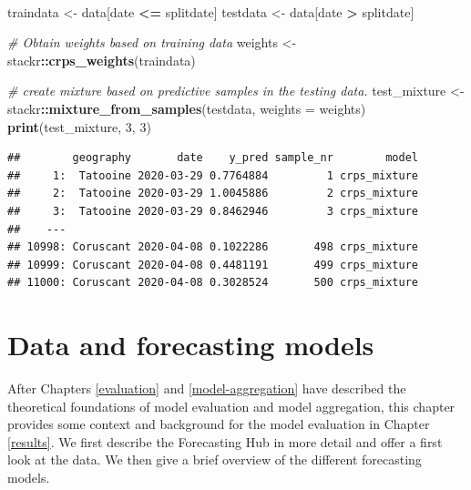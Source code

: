 \documentclass[
]{book}
\newenvironment{Shaded}{\begin{snugshade}}{\end{snugshade}}
\newcommand{\CommentTok}[1]{\textcolor[rgb]{0.56,0.35,0.01}{\textit{#1}}}
\newcommand{\DataTypeTok}[1]{\textcolor[rgb]{0.13,0.29,0.53}{#1}}
\newcommand{\DecValTok}[1]{\textcolor[rgb]{0.00,0.00,0.81}{#1}}
\newcommand{\KeywordTok}[1]{\textcolor[rgb]{0.13,0.29,0.53}{\textbf{#1}}}
\newcommand{\NormalTok}[1]{#1}
\newcommand{\OperatorTok}[1]{\textcolor[rgb]{0.81,0.36,0.00}{\textbf{#1}}}
\newcommand{\StringTok}[1]{\textcolor[rgb]{0.31,0.60,0.02}{#1}}
\begin{document}
\(~\)

\begin{Shaded}
\begin{Highlighting}[]
\NormalTok{traindata \textless{}{-}}\StringTok{ }\NormalTok{data[date }\OperatorTok{\textless{}=}\StringTok{ }\NormalTok{splitdate]}
\NormalTok{testdata \textless{}{-}}\StringTok{ }\NormalTok{data[date }\OperatorTok{\textgreater{}}\StringTok{ }\NormalTok{splitdate]}

\CommentTok{\# Obtain weights based on training data}
\NormalTok{weights \textless{}{-}}\StringTok{ }\NormalTok{stackr}\OperatorTok{::}\KeywordTok{crps\_weights}\NormalTok{(traindata)}

\CommentTok{\# create mixture based on predictive samples in the testing data. }
\NormalTok{test\_mixture \textless{}{-}}\StringTok{ }\NormalTok{stackr}\OperatorTok{::}\KeywordTok{mixture\_from\_samples}\NormalTok{(testdata, }\DataTypeTok{weights =}\NormalTok{ weights)}
\KeywordTok{print}\NormalTok{(test\_mixture, }\DecValTok{3}\NormalTok{, }\DecValTok{3}\NormalTok{)}
\end{Highlighting}
\end{Shaded}

\begin{verbatim}
##        geography       date    y_pred sample_nr        model
##     1:  Tatooine 2020-03-29 0.7764884         1 crps_mixture
##     2:  Tatooine 2020-03-29 1.0045886         2 crps_mixture
##     3:  Tatooine 2020-03-29 0.8462946         3 crps_mixture
##    ---                                                      
## 10998: Coruscant 2020-04-08 0.1022286       498 crps_mixture
## 10999: Coruscant 2020-04-08 0.4481191       499 crps_mixture
## 11000: Coruscant 2020-04-08 0.3028524       500 crps_mixture
\end{verbatim}

\hypertarget{background-data}{%
\chapter{Data and forecasting models}\label{background-data}}

After Chapters \ref{evaluation} and \ref{model-aggregation} have described the theoretical foundations of model evaluation and model aggregation, this chapter provides some context and background for the model evaluation in Chapter \ref{results}. We first describe the Forecasting Hub in more detail and offer a first look at the data. We then give a brief overview of the different forecasting models.
\end{document}
